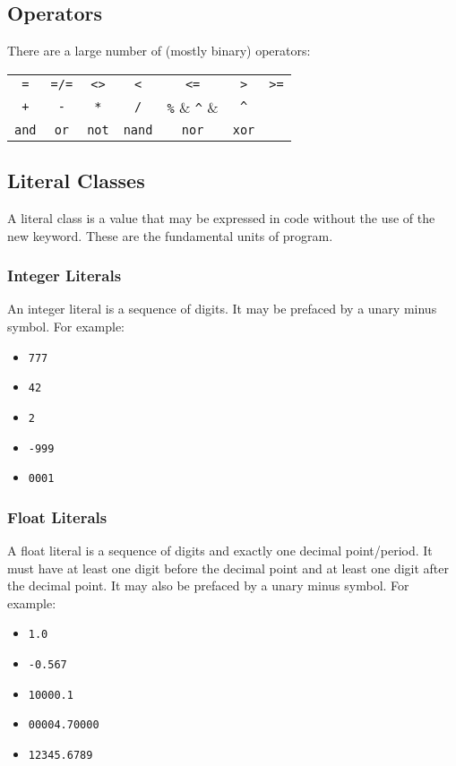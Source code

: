 \subsection{Operators}
There are a large number of (mostly binary) operators:
\begin{center}
\begin{tabular}{ccccccc}
\verb!=! & \verb!=/=! & \verb|<>| & \verb!<! & \verb!<=! & \verb!>! & \verb!>=!\\
\verb!+! & \verb!-! & \verb!*! & \verb!/! & \verb!%! & \verb!^! & \\
\verb!and! & \verb!or! & \verb!not! & \verb!nand! & \verb!nor! & \verb!xor!& \\
\end{tabular}
\end{center}

\subsection{Literal Classes}
A literal class is a value that may be expressed in code without the use of the new keyword. These are the fundamental units of program.

\subsubsection{Integer Literals}
An integer literal is a sequence of digits. It may be prefaced by a unary minus symbol. For example:
\begin{itemize}
\item \verb!777!
\item \verb!42!
\item \verb!2!
\item \verb!-999!
\item \verb!0001!
\end{itemize}

\subsubsection{Float Literals}
A float literal is a sequence of digits and exactly one decimal point/period. It must have at least one digit before the decimal point and at least one digit after the decimal point. It may also be prefaced by a unary minus symbol. For example:
\begin{itemize}
\item \verb!1.0!
\item \verb!-0.567!
\item \verb!10000.1!
\item \verb!00004.70000!
\item \verb!12345.6789!
\end{itemize}

